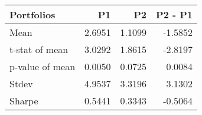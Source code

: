 \begin{tabular}{lrrr}
\toprule
Portfolios & P1 & P2 & P2 - P1 \\
\midrule
Mean & 2.6951 & 1.1099 & -1.5852 \\
t-stat of mean & 3.0292 & 1.8615 & -2.8197 \\
p-value of mean & 0.0050 & 0.0725 & 0.0084 \\
Stdev & 4.9537 & 3.3196 & 3.1302 \\
Sharpe & 0.5441 & 0.3343 & -0.5064 \\
\bottomrule
\end{tabular}
